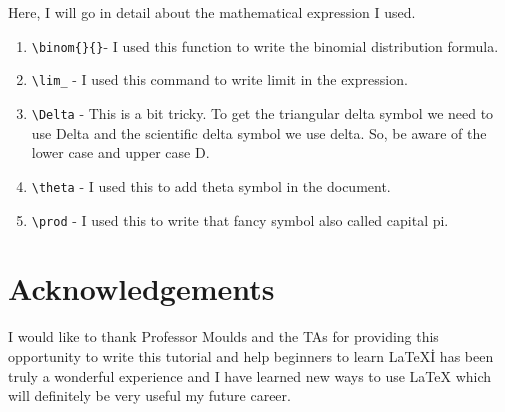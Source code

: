 \documentclass[12pt,journal,compsoc]{IEEEtran}
\begin{document}
\section{}
Here, I will go in detail about the mathematical expression I used. 

\begin{enumerate}
    \item \verb|\binom{}{}|- I used this function to write the binomial distribution formula.
    \item \verb|\lim_| - I used this command to write limit in the expression.
    \item \verb|\Delta| - This is a bit tricky. To get the triangular delta symbol we need to use Delta and the scientific delta symbol we use delta. So, be aware of the lower case and upper case D. 
    \item \verb|\theta| - I used this to add theta symbol in the document.
    \item \verb|\prod| - I used this to write that fancy symbol also called capital pi.
\end{enumerate}


\section*{Acknowledgements}
I would like to thank Professor Moulds and the TAs for providing this opportunity to write this tutorial and help beginners to learn \LaTeX\. I has been truly a wonderful experience and I have learned new ways to use LaTeX which will definitely be very useful my future career. 





\end{document}
